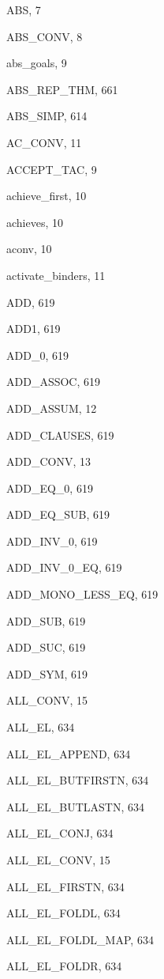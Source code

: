\begin{theindex}
  \item {\ptt ABS}, 7
  \item {\ptt ABS\_CONV}, 8
  \item {\ptt abs\_goals}, 9
  \item {\ptt ABS\_REP\_THM}, 661
  \item {\ptt ABS\_SIMP}, 614
  \item {\ptt AC\_CONV}, 11
  \item {\ptt ACCEPT\_TAC}, 9
  \item {\ptt achieve\_first}, 10
  \item {\ptt achieves}, 10
  \item {\ptt aconv}, 10
  \item {\ptt activate\_binders}, 11
  \item {\ptt ADD}, 619
  \item {\ptt ADD1}, 619
  \item {\ptt ADD\_0}, 619
  \item {\ptt ADD\_ASSOC}, 619
  \item {\ptt ADD\_ASSUM}, 12
  \item {\ptt ADD\_CLAUSES}, 619
  \item {\ptt ADD\_CONV}, 13
  \item {\ptt ADD\_EQ\_0}, 619
  \item {\ptt ADD\_EQ\_SUB}, 619
  \item {\ptt ADD\_INV\_0}, 619
  \item {\ptt ADD\_INV\_0\_EQ}, 619
  \item {\ptt ADD\_MONO\_LESS\_EQ}, 619
  \item {\ptt ADD\_SUB}, 619
  \item {\ptt ADD\_SUC}, 619
  \item {\ptt ADD\_SYM}, 619
  \item {\ptt ALL\_CONV}, 15
  \item {\ptt ALL\_EL}, 634
  \item {\ptt ALL\_EL\_APPEND}, 634
  \item {\ptt ALL\_EL\_BUTFIRSTN}, 634
  \item {\ptt ALL\_EL\_BUTLASTN}, 634
  \item {\ptt ALL\_EL\_CONJ}, 634
  \item {\ptt ALL\_EL\_CONV}, 15
  \item {\ptt ALL\_EL\_FIRSTN}, 634
  \item {\ptt ALL\_EL\_FOLDL}, 634
  \item {\ptt ALL\_EL\_FOLDL\_MAP}, 634
  \item {\ptt ALL\_EL\_FOLDR}, 634

\end{theindex}
